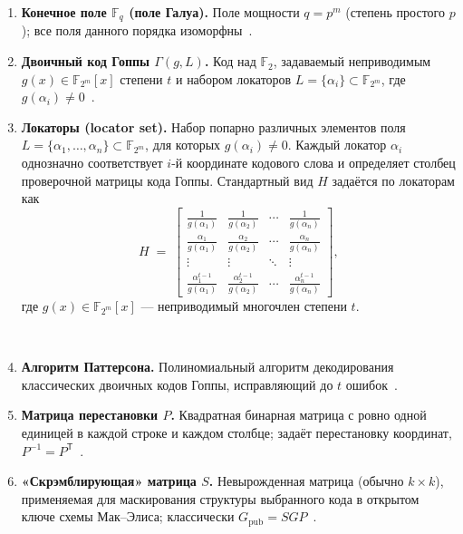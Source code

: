 \begin{enumerate}
\item \label{def:gf}
\textbf{Конечное поле \(\mathbb{F}_q\) (поле Галуа).}
Поле мощности \(q=p^m\) (степень простого \(p\)); все поля данного порядка изоморфны~\cite{LidlNiederreiter1997}.

\item \label{def:goppa}
\textbf{Двоичный код Гоппы \(\Gamma(g,L)\).}
Код над \(\mathbb{F}_{2}\), задаваемый неприводимым \(g(x)\in\mathbb{F}_{2^m}[x]\) степени \(t\) и набором локаторов \(L=\{\alpha_i\}\subset\mathbb{F}_{2^m}\), где \(g(\alpha_i)\neq 0\)~\cite{Goppa1970}.

\item \label{def:locator}
\textbf{Локаторы (locator set).}
Набор попарно различных элементов поля \(L=\{\alpha_1,\dots,\alpha_n\}\subset\mathbb{F}_{2^m}\), для которых \(g(\alpha_i)\neq 0\).
Каждый локатор \(\alpha_i\) однозначно соответствует \(i\)-й координате кодового слова и определяет столбец проверочной матрицы кода Гоппы.
Стандартный вид \(H\) задаётся по локаторам как
\[
H \;=\;
\begin{bmatrix}
\frac{1}{g(\alpha_1)} & \frac{1}{g(\alpha_2)} & \cdots & \frac{1}{g(\alpha_n)} \\
\frac{\alpha_1}{g(\alpha_1)} & \frac{\alpha_2}{g(\alpha_2)} & \cdots & \frac{\alpha_n}{g(\alpha_n)} \\
\vdots & \vdots & \ddots & \vdots \\
\frac{\alpha_1^{t-1}}{g(\alpha_1)} & \frac{\alpha_2^{t-1}}{g(\alpha_2)} & \cdots & \frac{\alpha_n^{t-1}}
{g(\alpha_n)}
\end{bmatrix},
\]
где \(g(x)\in\mathbb{F}_{2^m}[x]\) — неприводимый многочлен степени \(t\).

~\cite{HuffmanPless2003,CMspec2022}


\item \label{def:patterson}
\textbf{Алгоритм Паттерсона.}
Полиномиальный алгоритм декодирования классических двоичных кодов Гоппы, исправляющий до \(t\) ошибок~\cite{Patterson1975}.

\item \label{def:perm}
\textbf{Матрица перестановки \(P\).}
Квадратная бинарная матрица с ровно одной единицей в каждой строке и каждом столбце; задаёт перестановку координат, \(P^{-1}=P^{\mathsf T}\)~\cite{HornJohnson2013}.

\item \label{def:scrambler}
\textbf{«Скрэмблирующая» матрица \(S\).}
Невырожденная матрица (обычно \(k\times k\)), применяемая для маскирования структуры выбранного кода в открытом ключе схемы Мак–Элиса; классически \(G_{\text{pub}}=SGP\)~\cite{McEliece1978}.


\end{enumerate}
